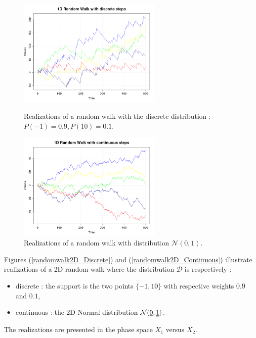 \begin{figure}[H]
  \begin{minipage}{9cm}
    \begin{center}
      \includegraphics[width=7cm]{randomwalk1D_discrete.png}
      \caption{Realizations of a random walk with the discrete distribution : $P(-1) = 0.9, P(10)=0.1$.}
      \label{randomwalk1D_Discrete}
    \end{center}
  \end{minipage}
  \hfill
  \begin{minipage}{9cm}
    \begin{center}
      \includegraphics[width=7cm]{randomwalk1D_continuous.png}
      \caption{Realizations of a random walk with distribution $\mathcal{N}(0,1)$.}
      \label{randomwalk1D_Continuous}
    \end{center}
  \end{minipage}
\end{figure}

Figures (\ref{randomwalk2D_Discrete}) and (\ref{randomwalk2D_Continuous}) illustrate realizations of a 2D random walk where the distribution $\mathcal{D}$ is respectively :
\begin{itemize}
  \item discrete :  the support is the two points $\{-1, 10\}$ with respective weights $0.9$ and $0.1$,
  \item continuous : the 2D Normal distribution $\mathcal{N}({\underline{0}},{\underline{\underline{1}}})$.
\end{itemize}
The realizations are  presented in the phase space $X_1$ versus $X_2$.



